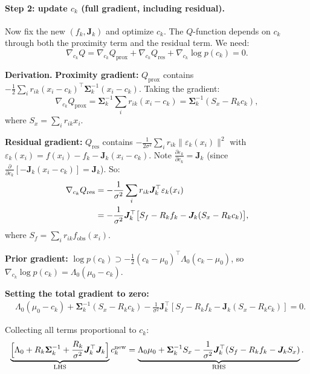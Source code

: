 \documentclass[11pt]{article}
\theoremstyle{definition}
\theoremstyle{plain}
\theoremstyle{remark}
\newcommand{\Sv}{\boldsymbol{\Sigma}}
\newcommand{\Jv}{\boldsymbol{J}}
\newenvironment{derivation}{\par\medskip\noindent\textbf{Derivation.} }{\par\medskip}
\begin{document}
\paragraph{Step 2: update $c_k$ (full gradient, including residual).}

Now fix the new $(f_k,\Jv_k)$ and optimize $c_k$. The $Q$-function depends on $c_k$ through both the proximity term and the residual term. We need:
\begin{equation}
  \nabla_{c_k}Q = \nabla_{c_k}Q_{\text{prox}} + \nabla_{c_k}Q_{\text{res}} + \nabla_{c_k}\log p(c_k) = 0.
\end{equation}

\begin{derivation}
\textbf{Proximity gradient:}
$Q_{\text{prox}}$ contains $-\frac{1}{2}\sum_i r_{ik}(x_i-c_k)^\top\Sv_k^{-1}(x_i-c_k)$. Taking the gradient:
\[
  \nabla_{c_k}Q_{\text{prox}} = \Sv_k^{-1}\sum_i r_{ik}(x_i-c_k) = \Sv_k^{-1}(S_x - R_k c_k),
\]
where $S_x=\sum_i r_{ik}x_i$.

\textbf{Residual gradient:}
$Q_{\text{res}}$ contains $-\frac{1}{2\sigma^2}\sum_i r_{ik}\|\varepsilon_k(x_i)\|^2$ with $\varepsilon_k(x_i)=f(x_i)-f_k-\Jv_k(x_i-c_k)$. Note $\frac{\partial\varepsilon_k}{\partial c_k}=\Jv_k$ (since $\frac{\partial}{\partial c_k}[-\Jv_k(x_i-c_k)]=\Jv_k$). So:
\begin{align}
  \nabla_{c_k}Q_{\text{res}} &= -\frac{1}{\sigma^2}\sum_i r_{ik}\Jv_k^\top\varepsilon_k(x_i) \notag \\
  &= -\frac{1}{\sigma^2}\Jv_k^\top\bigl[S_f - R_k f_k - \Jv_k(S_x - R_k c_k)\bigr],
\end{align}
where $S_f=\sum_i r_{ik}f_{\mathrm{obs}}(x_i)$.

\textbf{Prior gradient:}
$\log p(c_k)\supset -\frac{1}{2}(c_k-\mu_0)^\top\Lambda_0(c_k-\mu_0)$, so $\nabla_{c_k}\log p(c_k)=\Lambda_0(\mu_0-c_k)$.

\textbf{Setting the total gradient to zero:}
\begin{align}
  &\Lambda_0(\mu_0-c_k) + \Sv_k^{-1}(S_x-R_k c_k) - \frac{1}{\sigma^2}\Jv_k^\top[S_f-R_k f_k-\Jv_k(S_x-R_k c_k)] = 0.
\end{align}

Collecting all terms proportional to $c_k$:
\begin{equation}
  \underbrace{\Bigl[\Lambda_0 + R_k\Sv_k^{-1} + \frac{R_k}{\sigma^2}\Jv_k^\top\Jv_k\Bigr]}_{\text{LHS}} c_k^{\mathrm{new}} = \underbrace{\Lambda_0\mu_0 + \Sv_k^{-1}S_x - \frac{1}{\sigma^2}\Jv_k^\top(S_f - R_k f_k - \Jv_k S_x)}_{\text{RHS}}.
  \label{eq:ck-full-deriv}
\end{equation}
\end{derivation}
\end{document}

